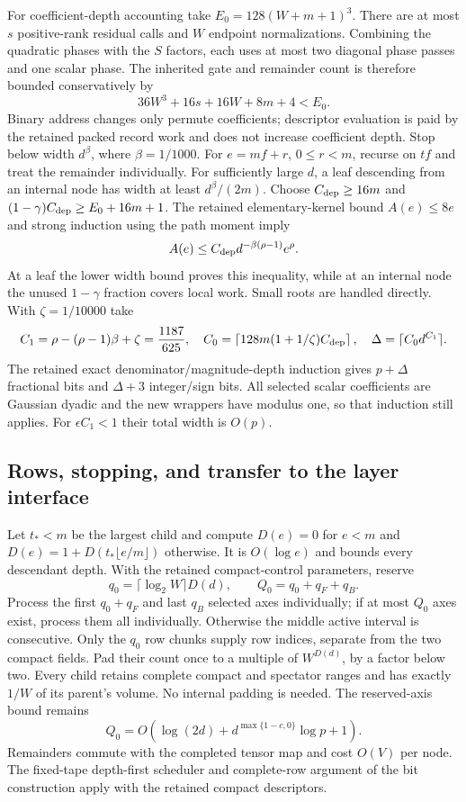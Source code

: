 For coefficient-depth accounting take $E_0=128(W+m+1)^3$.
There are at most $s$ positive-rank residual calls and $W$ endpoint
normalizations. Combining the quadratic phases with the $S$ factors,
each uses at most two diagonal phase passes and one scalar phase.
The inherited gate and remainder count is therefore bounded conservatively by
\[
 36W^3+16s+16W+8m+4<E_0.
\]
Binary address changes only permute coefficients; descriptor evaluation
is paid by the retained packed record work and does not increase
coefficient depth.
Stop below width $d^\beta$, where $\beta=1/1000$.
For $e=mf+r$, $0\le r<m$, recurse on $tf$ and treat the remainder
individually. For sufficiently large $d$, a leaf descending from an
internal node has width at least $d^\beta/(2m)$. Choose
$C_{\rm dep}\ge16m$ and
$(1-\gamma)C_{\rm dep}\ge E_0+16m+1$.
The retained elementary-kernel bound $A(e)\le8e$ and strong induction
using the path moment imply
\[
 A(e)\le C_{\rm dep}d^{-\beta(\rho-1)}e^\rho.
\]
At a leaf the lower width bound proves this inequality, while at an
internal node the unused $1-\gamma$ fraction covers local work.
Small roots are handled directly. With $\zeta=1/10000$ take
\[
 C_1=\rho-(\rho-1)\beta+\zeta=\frac{1187}{625},\quad
 C_0=\left\lceil128m(1+1/\zeta)C_{\rm dep}\right\rceil,
 \quad\Delta=\lceil C_0d^{C_1}\rceil.
\]
The retained exact denominator/magnitude-depth induction gives
$p+\Delta$ fractional bits and $\Delta+3$ integer/sign bits.
All selected scalar coefficients are Gaussian dyadic and the new
wrappers have modulus one, so that induction still applies.
For $\epsilon C_1<1$ their total width is $O(p)$.
\subsection{Rows, stopping, and transfer to the layer interface}
Let $t_*<m$ be the largest child and compute
$D(e)=0$ for $e<m$ and $D(e)=1+D(t_*\lfloor e/m\rfloor)$ otherwise.
It is $O(\log e)$ and bounds every descendant depth.
With the retained compact-control parameters, reserve
\[
 q_0=\lceil\log_2W\rceil D(d),\qquad Q_0=q_0+q_F+q_B.
\]
Process the first $q_0+q_F$ and last $q_B$ selected axes individually;
if at most $Q_0$ axes exist, process them all individually. Otherwise
the middle active interval is consecutive. Only the $q_0$ row chunks
supply row indices, separate from the two compact fields. Pad their
count once to a multiple of $W^{D(d)}$, by a factor below two.
Every child retains complete compact and spectator ranges and has
exactly $1/W$ of its parent's volume. No internal padding is needed.
The reserved-axis bound remains
\[
 Q_0=O(\log(2d)+d^{\max\{1-c,0\}}\log p+1).
\]
Remainders commute with the completed tensor map and cost $O(V)$ per
node. The fixed-tape depth-first scheduler and complete-row argument
of the bit construction apply with the retained compact descriptors.

